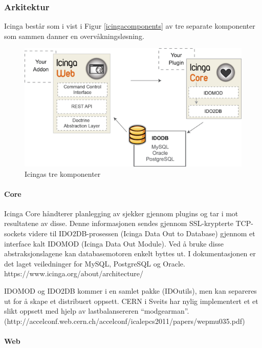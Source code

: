 \subsubsection{Arkitektur}

Icinga består som i vist i Figur \ref{icingacomponents} av tre separate komponenter som sammen danner en overvåkningsløsning.

\begin{center}
\begin{figure}
    \includegraphics{img/icinga_architecture}
    \caption{Icingas tre komponenter}
    \label{losninger}
\end{figure}
\end{center}

\paragraph{Core}
Icinga Core håndterer planlegging av sjekker gjennom plugins og tar i mot resultatene av disse. Denne informasjonen sendes gjennom SSL-krypterte TCP-sockets videre til IDO2DB-prosessen (Icinga Data Out to Database) gjennom et interface kalt IDOMOD (Icinga Data Out Module). Ved å bruke disse abstraksjonslagene kan databasemotoren enkelt byttes ut. I dokumentasjonen er det laget veiledninger for MySQL, PostgreSQL og Oracle.
https://www.icinga.org/about/architecture/

IDOMOD og IDO2DB kommer i en samlet pakke (IDOutils), men kan separeres ut for å skape et distribuert oppsett. CERN i Sveits har nylig implementert et et slikt oppsett med hjelp av lastbalansereren “modgearman”. (http://accelconf.web.cern.ch/accelconf/icalepcs2011/papers/wepmu035.pdf)

\paragraph{Web}

